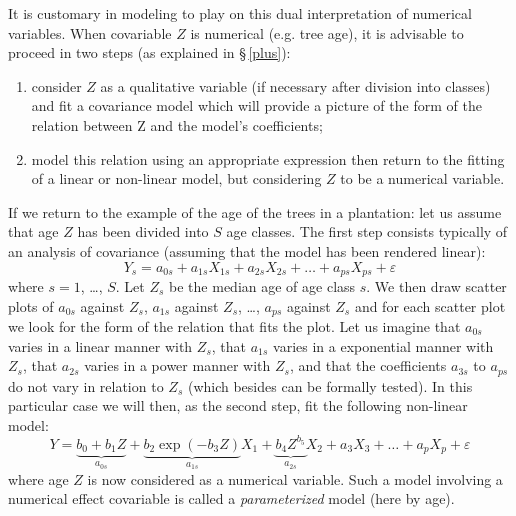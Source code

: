 It is customary in modeling to play on this dual interpretation of numerical variables. When covariable $Z$ is numerical (e.g. tree age), it is advisable to proceed in two steps (as explained in \S\,\ref{plus}):
\begin{enumerate}
\item consider $Z$ as a qualitative variable (if necessary after division into classes) and fit a covariance model which will provide a picture of the form of the relation between Z and the model's coefficients;
\item model this relation using an appropriate expression then return to the fitting of a linear or non-linear model, but considering $Z$ to be a numerical variable.
\end{enumerate}
If we return to the example of the age of the trees in a plantation: let us assume that age $Z$ has been divided into $S$ age classes. The first step consists typically of an analysis of covariance (assuming that the model has been rendered linear):
\[
Y_s=a_{0s}+a_{1s}X_{1s}+a_{2s}X_{2s}+\ldots+a_{ps}X_{ps}+\varepsilon
\]
where $s=1$, \ldots, $S$. Let $Z_s$ be the median age of age class $s$. We then draw scatter plots of $a_{0s}$ against $Z_s$, $a_{1s}$ against
$Z_s$, \ldots, $a_{ps}$ against $Z_s$ and for each scatter plot we look for the form of the relation that fits the plot. Let us imagine that $a_{0s}$ varies in a linear manner with $Z_s$, that $a_{1s}$ varies in a exponential manner with $Z_s$, that $a_{2s}$ varies in a power manner with $Z_s$, and that the coefficients $a_{3s}$ to $a_{ps}$ do not vary in relation to $Z_s$ (which besides can be formally tested). In this particular case we will then, as the second step, fit the following non-linear model:
\[
Y=\underbrace{b_0+b_1Z}_{a_{0s}}+\underbrace{b_2\exp(-b_3Z)}_{a_{1s}}X_1
+\underbrace{b_4Z^{b_5}}_{a_{2s}}X_2+a_3X_3+\ldots+a_pX_p+\varepsilon
\]
where age $Z$ is now considered as a numerical variable. Such a model involving a numerical effect covariable is called a \emph{parameterized} model (here by age).

